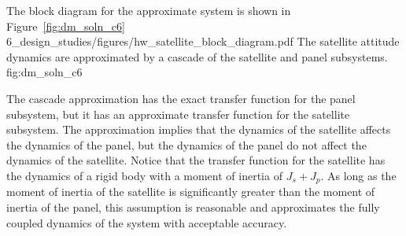 The block diagram for the approximate system is shown in Figure~\ref{fig:dm_soln_c6}
	{6_design_studies/figures/hw_satellite_block_diagram.pdf}
	{The satellite attitude dynamics are approximated by a cascade of the satellite and panel subsystems.}
	{fig:dm_soln_c6}

The cascade approximation has the exact transfer function for the panel subsystem, but it has an approximate transfer function for the satellite subsystem. The approximation implies that the dynamics of the satellite affects the dynamics of the panel, but the dynamics of the panel do not affect the dynamics of the satellite. Notice that the transfer function for the satellite has the dynamics of a rigid body with a moment of inertia of $J_s+J_p$. As long as the moment of inertia of the satellite is significantly greater than the moment of inertia of the panel, this assumption is reasonable and approximates the fully coupled dynamics of the system  with acceptable accuracy.
